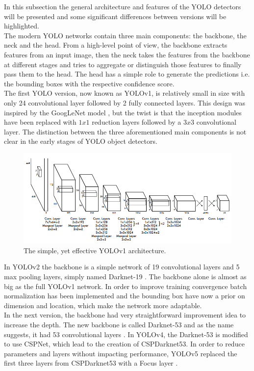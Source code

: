 In this subsection the general architecture and features of the YOLO detectors will be presented and some significant differences between versions will be highlighted. \\
The modern YOLO networks contain three main components: the backbone, the neck and the head. From a high-level point of view, the backbone extracts features from an input image, then the neck takes the features from the backbone at different stages and tries to aggregate or distinguish those features to finally pass them to the head. The head has a simple role to generate the predictions i.e. the bounding boxes with the respective confidence score. \\
The first YOLO version, now known as YOLOv1, is relatively small in size with only 24 convolutional layer followed by 2 fully connected layers. This design was inspired by the GoogLeNet model \cite{googlenet_paper}, but the twist is that the inception modules have been replaced with $1x1$ reduction layers followed by a $3x3$ convolutional layer. The distinction between the three aforementioned main components is not clear in the early stages of YOLO object detectors.

\begin{figure}[!h]
\centering
\captionsetup{justification=centering,margin=2cm}
\includegraphics[width=0.8\columnwidth]{images/detection/yolov1_arch}
\caption{The simple, yet effective YOLOv1 architecture.}
\label{detection:yolov1_arch}
\end{figure}


In YOLOv2 the backbone is a simple network of 19 convolutional layers and 5 max pooling layers, simply named Darknet-19 \cite{yolov2_paper}. The backbone alone is almost as big as the full YOLOv1 network. In order to improve training convergence batch normalization has been implemented and the bounding box have now a prior on dimension and location, which make the network more adaptable. \\
 In the next  version, the backbone had very straightforward improvement idea to increase the depth. The new backbone is called Darknet-53 and as the name suggests, it had 53 convolutional layers \cite{yolov3_paper}. In YOLOv4, the Darknet-53 is modified to use CSPNet, which lead to the creation of CSPDarknet53. In order to reduce parameters and layers without impacting performance, YOLOv5 replaced the first three layers from CSPDarknet53 with a Focus layer \cite{yolov5_focus}. \\

